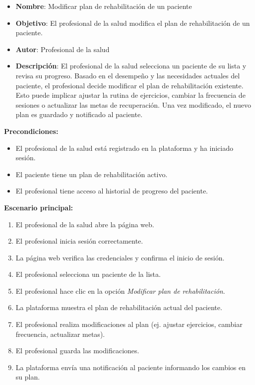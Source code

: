 \documentclass{article}
\begin{document}
\begin{itemize}
	\item \textbf{Nombre}: Modificar plan de rehabilitación de un paciente
	\item \textbf{Objetivo}: El profesional de la salud modifica el plan de rehabilitación de un paciente.
	\item \textbf{Autor}: Profesional de la salud
	\item \textbf{Descripción}: 
	El profesional de la salud selecciona un paciente de su lista y revisa su progreso. Basado en el desempeño y las necesidades actuales del paciente, el profesional decide modificar el plan de rehabilitación existente. Esto puede implicar ajustar la rutina de ejercicios, cambiar la frecuencia de sesiones o actualizar las metas de recuperación. Una vez modificado, el nuevo plan es guardado y notificado al paciente.
\end{itemize}

\textbf{Precondiciones:}
\begin{itemize}
	\item El profesional de la salud está registrado en la plataforma y ha iniciado sesión.
	\item El paciente tiene un plan de rehabilitación activo.
	\item El profesional tiene acceso al historial de progreso del paciente.
\end{itemize}

\textbf{Escenario principal:}
\begin{enumerate}
	\item El profesional de la salud abre la página web.
	\item El profesional inicia sesión correctamente.
	\item La página web verifica las credenciales y confirma el inicio de sesión.
	\item El profesional selecciona un paciente de la lista.
	\item El profesional hace clic en la opción \textit{Modificar plan de rehabilitación}.
	\item La plataforma muestra el plan de rehabilitación actual del paciente.
	\item El profesional realiza modificaciones al plan (ej. ajustar ejercicios, cambiar frecuencia, actualizar metas).
	\item El profesional guarda las modificaciones.
	\item La plataforma envía una notificación al paciente informando los cambios en su plan.
\end{enumerate}
\end{document}
